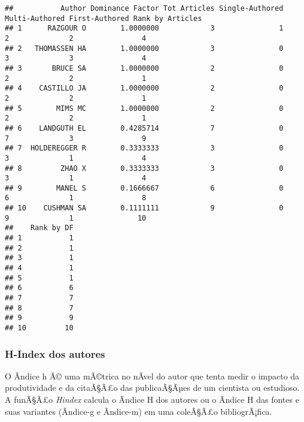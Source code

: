\documentclass[]{article}
\newenvironment{Shaded}{\begin{snugshade}}{\end{snugshade}}
\newcommand{\KeywordTok}[1]{\textcolor[rgb]{0.13,0.29,0.53}{\textbf{#1}}}
\newcommand{\DataTypeTok}[1]{\textcolor[rgb]{0.13,0.29,0.53}{#1}}
\newcommand{\DecValTok}[1]{\textcolor[rgb]{0.00,0.00,0.81}{#1}}
\newcommand{\StringTok}[1]{\textcolor[rgb]{0.31,0.60,0.02}{#1}}
\newcommand{\CommentTok}[1]{\textcolor[rgb]{0.56,0.35,0.01}{\textit{#1}}}
\newcommand{\OperatorTok}[1]{\textcolor[rgb]{0.81,0.36,0.00}{\textbf{#1}}}
\newcommand{\NormalTok}[1]{#1}
\begin{document}
\begin{verbatim}
##           Author Dominance Factor Tot Articles Single-Authored Multi-Authored First-Authored Rank by Articles
## 1      RAZGOUR O        1.0000000            3               1              2              2                4
## 2   THOMASSEN HA        1.0000000            3               0              3              3                4
## 3       BRUCE SA        1.0000000            2               0              2              2                1
## 4    CASTILLO JA        1.0000000            2               0              2              2                1
## 5        MIMS MC        1.0000000            2               0              2              2                1
## 6    LANDGUTH EL        0.4285714            7               0              7              3                9
## 7  HOLDEREGGER R        0.3333333            3               0              3              1                4
## 8         ZHAO X        0.3333333            3               0              3              1                4
## 9        MANEL S        0.1666667            6               0              6              1                8
## 10    CUSHMAN SA        0.1111111            9               0              9              1               10
##    Rank by DF
## 1           1
## 2           1
## 3           1
## 4           1
## 5           1
## 6           6
## 7           7
## 8           7
## 9           9
## 10         10
\end{verbatim}

\subsubsection{H-Index dos autores}\label{h-index-dos-autores}

O Ã­ndice h Ã© uma mÃ©trica no nÃ­vel do autor que tenta medir o impacto
da produtividade e da citaÃ§Ã£o das publicaÃ§Ãµes de um cientista ou
estudioso. A funÃ§Ã£o \emph{Hindex} calcula o Ã­ndice H dos autores ou o
Ã­ndice H das fontes e suas variantes (Ã­ndice-g e Ã­ndice-m) em uma
coleÃ§Ã£o bibliogrÃ¡fica.

\begin{Shaded}
\end{Shaded}
\end{document}
